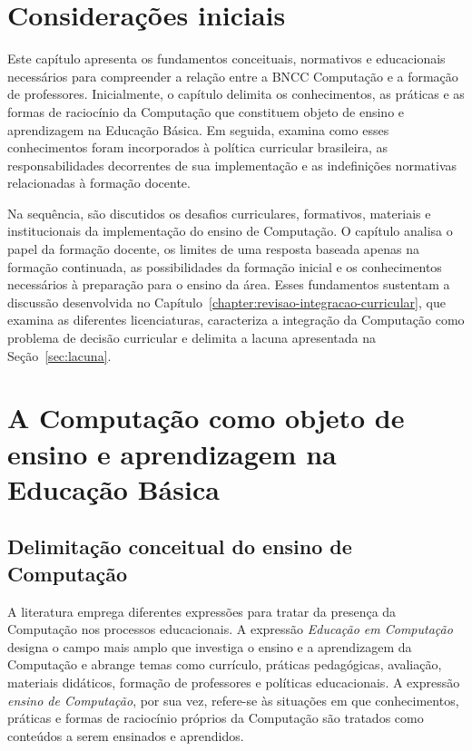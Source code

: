 \section{Considerações iniciais}
\label{sec:consideracoes-iniciais-referencial}

Este capítulo apresenta os fundamentos conceituais, normativos e educacionais necessários para compreender a relação entre a BNCC Computação e a formação de professores. Inicialmente, o capítulo delimita os conhecimentos, as práticas e as formas de raciocínio da Computação que constituem objeto de ensino e aprendizagem na Educação Básica. Em seguida, examina como esses conhecimentos foram incorporados à política curricular brasileira, as responsabilidades decorrentes de sua implementação e as indefinições normativas relacionadas à formação docente.

Na sequência, são discutidos os desafios curriculares, formativos, materiais e institucionais da implementação do ensino de Computação. O capítulo analisa o papel da formação docente, os limites de uma resposta baseada apenas na formação continuada, as possibilidades da formação inicial e os conhecimentos necessários à preparação para o ensino da área. Esses fundamentos sustentam a discussão desenvolvida no Capítulo~\ref{chapter:revisao-integracao-curricular}, que examina as diferentes licenciaturas, caracteriza a integração da Computação como problema de decisão curricular e delimita a lacuna apresentada na Seção~\ref{sec:lacuna}.

\section{A Computação como objeto de ensino e aprendizagem na Educação Básica}
\label{sec:computacao-conhecimento-escolar}

\subsection{Delimitação conceitual do ensino de Computação}
\label{subsec:delimitacao-educacao-computacao}

A literatura emprega diferentes expressões para tratar da presença da Computação nos processos educacionais. A expressão \textit{Educação em Computação} designa o campo mais amplo que investiga o ensino e a aprendizagem da Computação e abrange temas como currículo, práticas pedagógicas, avaliação, materiais didáticos, formação de professores e políticas educacionais. A expressão \textit{ensino de Computação}, por sua vez, refere-se às situações em que conhecimentos, práticas e formas de raciocínio próprios da Computação são tratados como conteúdos a serem ensinados e aprendidos.

